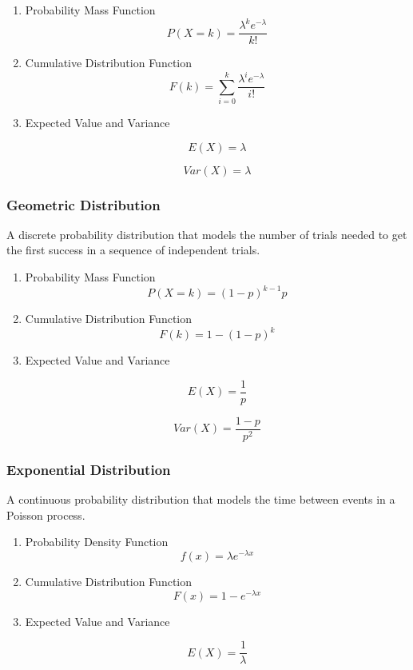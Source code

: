 \documentclass[11pt]{article}
\def\cheatsheetitemsep{-0.5em}
\let\olditem\item
\def\item{\vspace{\cheatsheetitemsep}\olditem}
\begin{document}
\begin{enumerate}
\item Probability Mass Function
\label{sec:orgc58cf1c}
\[
P(X=k) = \frac{\lambda^k e^{-\lambda}}{k!}
\]

\item Cumulative Distribution Function
\label{sec:org99b5c65}
\[
F(k) = \sum_{i=0}^k \frac{\lambda^i e^{-\lambda}}{i!}
\]

\item Expected Value and Variance
\label{sec:orgab66592}

\[
E(X) = \lambda
\]

\[
Var(X) = \lambda
\]
\end{enumerate}


\subsubsection{Geometric Distribution}
\label{sec:org7519f84}
A discrete probability distribution that models the number of trials needed to get the first success in a sequence of independent trials.

\begin{enumerate}
\item Probability Mass Function
\label{sec:org8fd37ac}
\[
P(X=k) = (1-p)^{k-1} p
\]

\item Cumulative Distribution Function
\label{sec:org2036136}
\[
F(k) = 1 - (1-p)^k
\]

\item Expected Value and Variance
\label{sec:orgb8cb32d}

\[
E(X) = \frac{1}{p}
\]

\[
Var(X) = \frac{1-p}{p^2}
\]
\end{enumerate}


\subsubsection{Exponential Distribution}
\label{sec:orged67808}
A continuous probability distribution that models the time between events in a Poisson process.

\begin{enumerate}
\item Probability Density Function
\label{sec:orgdb92fca}
\[
f(x) = \lambda e^{-\lambda x}
\]

\item Cumulative Distribution Function
\label{sec:orgc8c85b7}
\[
F(x) = 1 - e^{-\lambda x}
\]

\item Expected Value and Variance
\label{sec:org54e02c0}

\[
E(X) = \frac{1}{\lambda}
\]
\end{enumerate}
\end{document}

